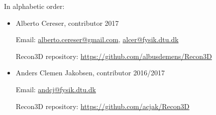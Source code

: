 \documentclass[11pt]{scrartcl}
\begin{document}
In alphabetic order:
\begin{itemize}
    \item Alberto Cereser, contributor 2017
    
    Email: \href{alberto.cereser@gmail.com}{alberto.cereser@gmail.com}, \href{alcer@fysik.dtu.dk}{alcer@fysik.dtu.dk}
    
    Recon3D repository: \href{https://github.com/albusdemens/Recon3D}{https://github.com/albusdemens/Recon3D}

    \item Anders Clemen Jakobsen, contributor 2016/2017
    
    Email: \href{andcj@fysik.dtu.dk}{andcj@fysik.dtu.dk}
    
    Recon3D repository: \href{https://github.com/acjak/Recon3D}{https://github.com/acjak/Recon3D}

\end{itemize}



\end{document}

